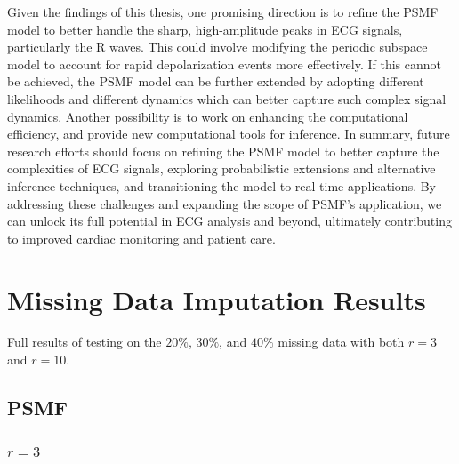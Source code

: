 \documentclass{mldsmsc}
\begin{document}
Given the findings of this thesis, one promising direction is to refine the PSMF model to better handle the sharp, high-amplitude peaks in ECG signals, particularly the R waves. This could involve modifying the periodic subspace model to account for rapid depolarization events more effectively. If this cannot be achieved, the PSMF model can be further extended by adopting different likelihoods and different dynamics which can better capture such complex signal dynamics. Another possibility is to work on enhancing the computational efficiency, and provide new computational tools for inference. In summary, future research efforts should focus on refining the PSMF model to better capture the complexities of ECG signals, exploring probabilistic extensions and alternative inference techniques, and transitioning the model to real-time applications. By addressing these challenges and expanding the scope of PSMF's application, we can unlock its full potential in ECG analysis and beyond, ultimately contributing to improved cardiac monitoring and patient care.

\clearpage
\renewcommand*{\thepage}{A\arabic{page}}




\appendix

\chapter{Missing Data Imputation Results}\label{app:mdi}

Full results of testing on the $20\%$, $30\%$, and $40\%$ missing data with both $r = 3$ and $r = 10$.

\section{PSMF}

\subsection{$r = 3$}
\end{document}
